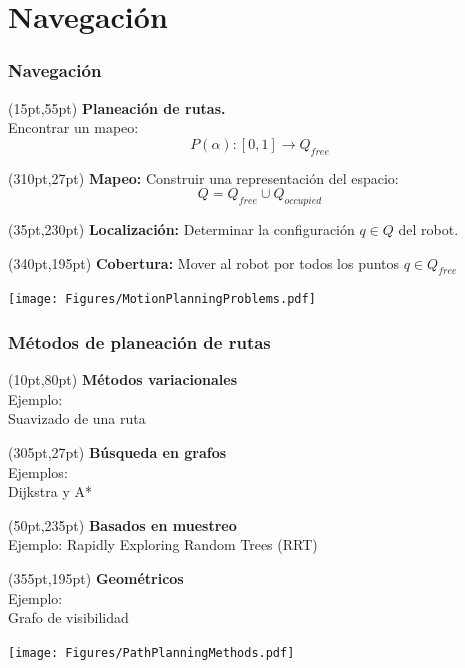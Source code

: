 \documentclass[10pt,spanish,aspectratio=1610]{beamer}
\begin{document}
\section{Navegación}
\begin{frame}\frametitle{Navegación}
  \begin{textblock*}{0.4\textwidth}(15pt,55pt)
    \textbf{ Planeación de rutas. }\\Encontrar un mapeo: 
    \[P(\alpha): [0,1] \rightarrow Q_{free}\]
  \end{textblock*}
  \begin{textblock*}{0.35\textwidth}(310pt,27pt)
    \textbf{Mapeo: }Construir una representación del espacio:
    \[Q = Q_{free} \cup Q_{occupied}\]
  \end{textblock*}
  \begin{textblock*}{0.35\textwidth}(35pt,230pt)
    \textbf{Localización: }Determinar la configuración $q\in Q$ del robot.
  \end{textblock*}
  \begin{textblock*}{0.25\textwidth}(340pt,195pt)
    \textbf{Cobertura: }Mover al robot por todos los puntos $q\in Q_{free}$
  \end{textblock*}
  \centering  \texttt{[image: Figures/MotionPlanningProblems.pdf]}
\end{frame}

\begin{frame}\frametitle{Métodos de planeación de rutas}
  \begin{textblock*}{0.4\textwidth}(10pt,80pt)
    \textbf{ Métodos variacionales }\\Ejemplo:\\ Suavizado de una ruta
  \end{textblock*}
  \begin{textblock*}{0.35\textwidth}(305pt,27pt)
    \textbf{Búsqueda en grafos }\\Ejemplos: \\Dijkstra y A*
  \end{textblock*}
  \begin{textblock*}{0.3\textwidth}(50pt,235pt)
    \textbf{Basados en muestreo }\\Ejemplo: Rapidly Exploring Random Trees (RRT)
  \end{textblock*}
  \begin{textblock*}{0.25\textwidth}(355pt,195pt)
    \textbf{Geométricos }\\Ejemplo: \\ Grafo de visibilidad
  \end{textblock*}
  \centering
  \texttt{[image: Figures/PathPlanningMethods.pdf]}
\end{frame}
\end{document}

